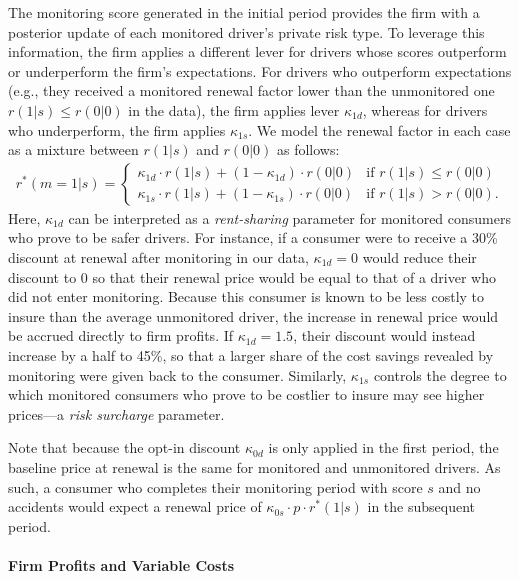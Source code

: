 The monitoring score generated in the initial period provides the firm with a posterior update of each monitored driver's private risk type. To leverage this information, the firm applies a different lever for drivers whose scores outperform or underperform the firm's expectations.  For drivers who outperform expectations (e.g., they received a monitored renewal factor lower than the unmonitored one $r(1|s) \leq r(0|0)$ in the data), the firm applies lever $\kappa_{1d}$, whereas for drivers who underperform, the firm applies  $\kappa_{1s}$.
We model the renewal factor in each case as a mixture between $r(1|s)$ and $r(0|0)$ as follows:
\begin{align}\label{eq:renewal-factor-kappa}
r^{\ast}(m=1|s) =
\begin{cases}
\kappa_{1d} \cdot r(1|s) + (1- \kappa_{1d}) \cdot r(0|0) & \text{if }r(1|s)\leq r(0|0)\\
\kappa_{1s} \cdot r(1|s) + (1- \kappa_{1s}) \cdot r(0|0) & \text{if }r(1|s)>r(0|0).
\end{cases}
\end{align}
Here, $\kappa_{1d}$ can be interpreted as a  \textit{rent-sharing} parameter for monitored consumers who prove to be safer drivers.
For instance, if a consumer were to receive a 30\% discount at renewal after monitoring in our data, $\kappa_{1d}=0$ would reduce their discount to 0 so that their renewal price would be equal to that of a driver who did not enter monitoring.  Because this consumer is known to be less costly to insure than the average unmonitored driver, the increase in renewal price would be accrued directly to firm profits.
If $\kappa_{1d}=1.5$, their discount would instead increase by a half to 45\%, so that a larger share of the cost savings revealed by monitoring were given back to the consumer. Similarly, $\kappa_{1s}$ controls the degree to which monitored consumers who prove to be costlier to insure may see higher prices---a \textit{risk surcharge} parameter.

Note that because the opt-in discount $\kappa_{0d}$ is only applied in the first period, the baseline price at renewal is the same for monitored and unmonitored drivers. As such, a consumer who completes their monitoring period with score $s$ and no accidents would expect a renewal price of $\kappa_{0s} \cdot p \cdot r^{\ast}(1|s)$ in the subsequent period.

\paragraph{Firm Profits and Variable Costs}

